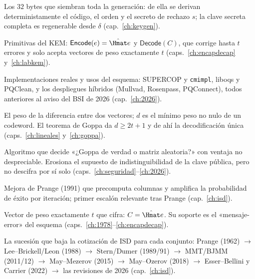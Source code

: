 \begin{description}[leftmargin=2.6em,style=nextline,itemsep=2.5pt,parsep=0pt]
  \item[\textbf{Delta} ($\delta$; semilla)]
        Los $32$ bytes que siembran toda la generación: de ella se
        derivan deterministamente el código, el orden y el secreto
        de rechazo $s$; la clave secreta completa es regenerable
        desde $\delta$ (cap.~\ref{ch:keygen}).

  \item[\textbf{Decode / Encode}]
        Primitivas del KEM: $\textsf{Encode}(e)=\hat{\Hmat}e$ y
        $\textsf{Decode}(C)$, que corrige hasta $t$ errores y solo
        acepta vectores de peso exactamente $t$
        (caps.~\ref{ch:encapdecap} y~\ref{ch:labkem}).

  \item[\textbf{Despliegues}]
        Implementaciones reales y usos del esquema: SUPERCOP y
        \texttt{cmimpl}, liboqs y PQClean, y los despliegues
        híbridos (Mullvad, Rosenpass, PQConnect), todos anteriores
        al aviso del BSI de 2026 (cap.~\ref{ch:2026}).

  \item[\textbf{Distancia de Hamming; distancia mínima} ($d$)]
        El peso de la diferencia entre dos vectores; $d$ es el
        mínimo peso no nulo de un codeword. El teorema de Goppa da
        $d\ge2t+1$ y de ahí la decodificación única
        (caps.~\ref{ch:lineales} y~\ref{ch:goppa}).

  \item[\textbf{Distinguidor}]
        Algoritmo que decide «¿Goppa de verdad o matriz aleatoria?»
        con ventaja no despreciable. Erosiona el supuesto de
        indistinguibilidad de la clave pública, pero no descifra
        por sí solo (caps.~\ref{ch:seguridad}--\ref{ch:2026}).

  \item[\textbf{Dumer, algoritmo de}]
        Mejora de Prange (1991) que precomputa columnas y
        amplifica la probabilidad de éxito por iteración; primer
        escalón relevante tras Prange (cap.~\ref{ch:isd}).

  \item[\textbf{$e$ (vector de error)}]
        Vector de peso exactamente $t$ que cifra:
        $C=\hat{\Hmat}e$. Su soporte es el «mensaje-error» del
        esquema (caps.~\ref{ch:1978}--\ref{ch:encapdecap}).

  \item[\textbf{Escalera de ataques}]
        La sucesión que baja la cotización de ISD para cada
        conjunto: Prange (1962) $\to$ Lee--Brickell/Leon (1988)
        $\to$ Stern/Dumer (1989/91) $\to$ MMT/BJMM (2011/12)
        $\to$ May--Mezerov (2015) $\to$ May--Ozerov (2018)
        $\to$ Esser--Bellini y Carrier (2022) $\to$ las revisiones
        de 2026 (cap.~\ref{ch:isd}).


\end{description}
